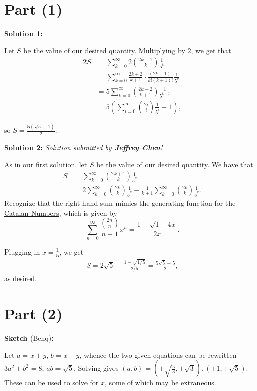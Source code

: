
\section*{Part (1)}

\begin{solution}
\textbf{Solution 1}\textbf{:}\V

Let $S$ be the value of our desired quantity. Multiplying by $2$, we get that 
\begin{align*}
    2S &= \sum_{k=0}^{\infty} 2\binom{2k+1}{k}\frac{1}{5^k} \\
    &= \sum_{k=0}^{\infty} \frac{2k+2}{k+1}\cdot \frac{(2k+1)!}{k!(k+1)!} \frac{1}{5^k} \\
    &= 5 \sum_{k=0}^{\infty} \binom{2k+2}{k+1} \frac{1}{5^{k+1}} \\
    &= 5 \left(\sum_{i=0}^{\infty} \binom{2i}{i} \frac{1}{5^i} - 1\right),
\end{align*}

so $S = \frac{5(\sqrt{5}-1)}{2}$.
\end{solution}

\begin{solution}
\textbf{Solution 2}\textbf{:}\newline
\textit{Solution submitted by \textbf{Jeffrey Chen}!}\V

As in our first solution, let $S$ be the value of our desired quantity. We have that
\begin{align*}
    S &= \sum_{k=0}^{\infty} \binom{2k+1}{k}\frac{1}{5^k} \\
    &= 2\sum_{k=0}^{\infty} \binom{2k}{k}\frac{1}{5^k} - \frac{1}{k+1} \sum_{k=0}^{\infty} \binom{2k}{k}\frac{1}{5^k}.
\end{align*}
Recognize that the right-hand sum mimics the generating function for the \href{https://en.wikipedia.org/wiki/Catalan_number}{Catalan Numbers}, which is given by
\[\sum_{n=0}^{\infty}\frac{\binom{2n}{n}}{n+1}x^n = \frac{1-\sqrt{1-4x}}{2x}.\]

Plugging in $x=\frac{1}{5}$, we get 
\begin{align*}
    S = 2\sqrt{5} - \frac{1 - \sqrt{1/5}}{2/5} = \frac{5\sqrt{5}-5}{2},
\end{align*}
as desired.
\end{solution}

\section*{Part (2)}

\begin{solution}
\textbf{Sketch} (Benq)\textbf{:}\V

Let $a = x+y$, $b=x-y$, whence the two given equations can be rewritten $3a^2+b^2 = 8$, $ab=\sqrt{5}$. Solving gives $(a,b) = (\pm \sqrt{\frac{5}{3}}, \pm \sqrt{3}), (\pm 1, \pm \sqrt{5})$. These can be used to solve for $x$, some of which may be extraneous.
\end{solution}